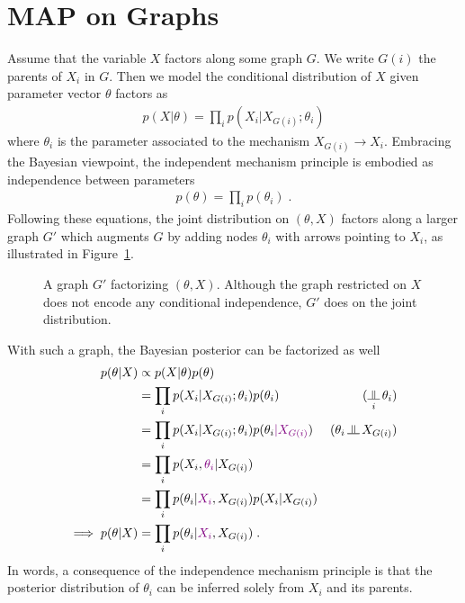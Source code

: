 \documentclass{article}
\newcommand{\violet}[1]{\textcolor{violet}{#1}}
\newcommand{\natp}{\theta}
\begin{document}
\section{MAP on Graphs}
Assume that the variable $X$ factors along some graph $G$. 
We write $G(i)$ the parents of $X_i$ in $G$. 
Then we model the conditional distribution of $X$ given parameter vector $\theta$ factors as
\begin{align}
    p(X|\natp) = \prod_i p(X_i | X_{G(i)};\natp_i)
\end{align}
where $\natp_i$ is the parameter associated to the mechanism $X_{G(i)} \rightarrow X_i$. 
Embracing the Bayesian viewpoint, the independent mechanism principle is embodied as independence between parameters
\begin{align}
    p(\natp) = \prod_i p(\natp_i) \; .
\end{align}
Following these equations, the joint distribution on $(\natp,X)$ factors along a larger graph $G'$ which augments $G$ by adding nodes $\natp_i$ with arrows pointing to $X_i$, as illustrated in Figure~\ref{fig:joint_graph}.
\begin{figure}[ht]
    \centering
    \caption{A graph $G'$ factorizing $(\natp,X)$. Although the graph restricted on $X$ does not encode any conditional independence, $G'$ does on the joint distribution.}
    \label{fig:joint_graph}
\end{figure}
With such a graph, the Bayesian posterior can be factorized as well
\begin{align}
    p(\natp|X) 
    &\propto  p(X|\natp) p(\natp)& \\
    & = \prod_i p(X_i | X_{G(i)};\natp_i) p(\natp_i)
    &(\indep_i \natp_i) \\
    & = \prod_i p(X_i | X_{G(i)};\natp_i) p(\natp_i\violet{|X_{G(i)}})
    &(\natp_i \indep X_{G(i)}) \\
    & = \prod_i p(X_i, \violet{\natp_i} | X_{G(i)})    &  \\
    & = \prod_i p(\natp_i| \violet{X_i}, X_{G(i)})p(X_i|X_{G(i)})    &  \\
    \implies p(\natp|X) 
    &= \prod_i p(\natp_i| \violet{X_i}, X_{G(i)}) \; .
\end{align}
In words, a consequence of the independence mechanism principle is that the posterior distribution of $\natp_i$ can be inferred solely from $X_i$ and its parents. 
\end{document}
